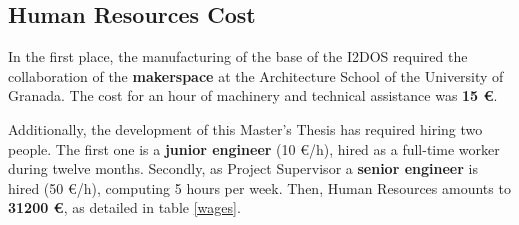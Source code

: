 \begin{appendices}
%
%
%

\section{Human Resources Cost} \label{humcosts}

In the first place, the manufacturing of the base of the \acrshort{I2DOS} required the collaboration of the \textbf{makerspace} at the Architecture School of the University of Granada. The cost for an hour of machinery and technical assistance was \textbf{15 €}.

Additionally, the development of this Master's Thesis has required hiring two people. The first one is a \textbf{junior engineer} (10 €/h), hired as a full-time worker during twelve months. Secondly, as Project Supervisor a \textbf{senior engineer} is hired (50 €/h), computing 5 hours per week. Then, Human Resources amounts to \textbf{31200 €}, as detailed in table \ref{wages}.

\begin{table}[H]
\centering


\end{table}
\end{appendices}
